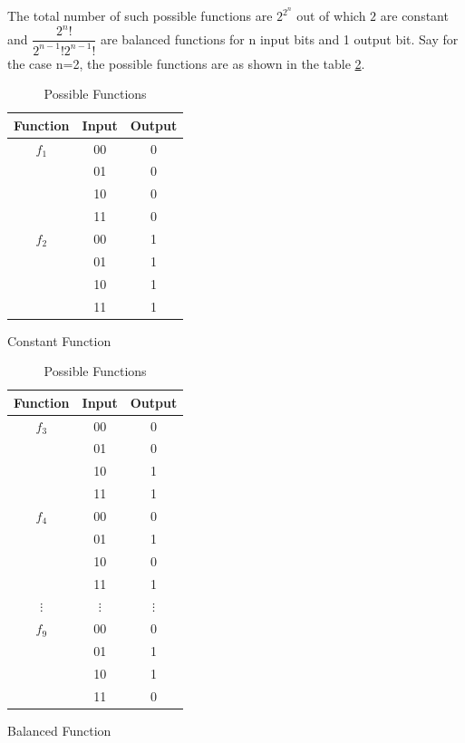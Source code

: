 \documentclass[12pt, oneside]{book}
\theoremstyle{definition}
\theoremstyle{definition}
\theoremstyle{remark}
\begin{document}
The total number of such possible functions are $2^{2^n}$ out of which $2$ are constant and $\dfrac{2^n!}{2^{n-1}!2^{n-1}!}$ are balanced functions for n input bits and 1 output bit.
Say for the case n=2, the possible functions are as shown in the table \ref{tab:Deutsch-Josza}.
\begin{table}[H]
    \centering
    \begin{subtable}[b]{0.45\linewidth}
        \centering
        \begin{tabular}{|c|c|c|}
            \hline
            Function & Input & Output \\
            \hline
            $f_1$& 00 & 0 \\
            & 01 & 0 \\
            & 10 & 0 \\
            & 11 & 0 \\
            \hline
            $f_2$& 00 & 1 \\
            & 01 & 1 \\
            & 10 & 1 \\
            & 11 & 1 \\
            \hline
        \end{tabular}
        \caption{Constant Function}
    \end{subtable}%
    \begin{subtable}[b]{0.45\linewidth}
        \centering
        \begin{tabular}{|c|c|c|}
            \hline
            Function & Input & Output \\
            \hline
            $f_3$& 00 & 0 \\
            & 01 & 0 \\
            & 10 & 1 \\
            & 11 & 1 \\
            \hline
            $f_4$& 00 & 0 \\
            & 01 & 1 \\
            & 10 & 0 \\
            & 11 & 1 \\
            \hline
            $\vdots$& $\vdots$ & $\vdots$ \\
            \hline
            $f_{9}$ & 00 & 0 \\
            & 01 & 1 \\
            & 10 & 1 \\
            & 11 & 0 \\
            \hline
        \end{tabular}
        \caption{Balanced Function}
    \end{subtable}
    \caption{Possible Functions}
    \label{tab:Deutsch-Josza}
\end{table}
\end{document}
